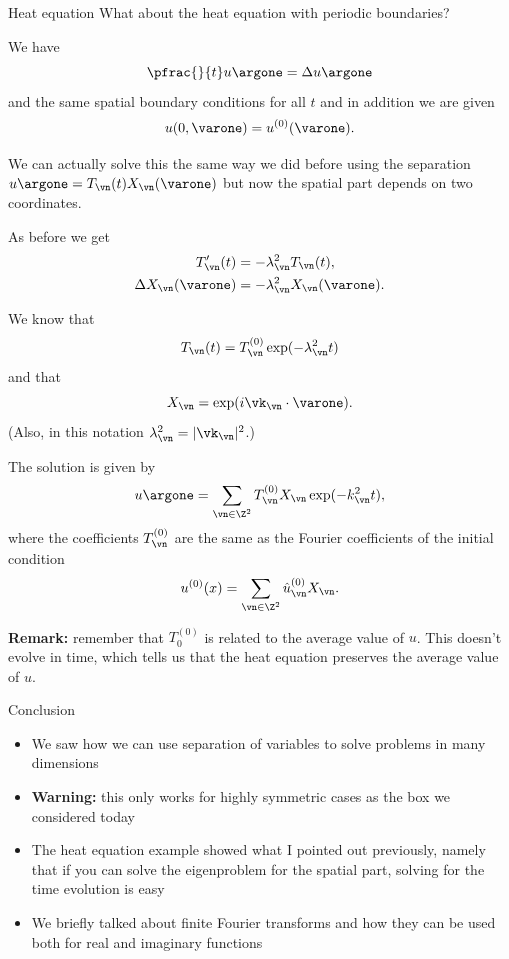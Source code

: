 \begin{frame}{Heat equation}
	What about the heat equation with periodic boundaries?
	
	\pause
	We have 
	\[  
	\pfrac{}{t} u\argone = \Delta u\argone
	\]
	and the same spatial boundary conditions for all $ t $ and in addition we are given
	\[  
	u(0,\varone) = u^{(0)}(\varone).
	\]
	
	\pause
	We can actually solve this the same way we did before using the separation $ u\argone = T_\vn(t) X_\vn (\varone)$ but now the spatial part depends on two coordinates. 
	
\end{frame}

\begin{frame}
	As before we get 
	\[  
	\begin{split}
	T_{\vn}'(t) &= -\lambda_{\vn}^2 T_{\vn}(t), \\
	\Delta X_{\vn}(\varone) &= -\lambda_{\vn}^2 X_{\vn}(\varone).
	\end{split}
	\]
	
	\pause
	We know that 
	\[  
	T_{\vn}(t) = T_{\vn}^{(0)} \exp(-\lambda_{\vn}^2 t)
	\]
	\pause
	and that 
	\[  
	X_\vn = \exp(i \vk_{\vn}\cdot \varone ).
	\]
	(Also, in this notation $ \lambda_{\vn}^2 = |\vk_{\vn}|^2$.)
	
\end{frame}

\begin{frame}
	The solution is given by 
	\[  
	u\argone = \sum_{\vn\in \Z^2} T_{\vn}^{(0)} X_\vn \exp(-k_{\vn}^2 t),
	\]
	where the coefficients $ T_{\vn}^{(0)} $ are the same as the Fourier coefficients of the initial condition 
	\[  
	u^{(0)}(x) = \sum_{\vn\in \Z^2} \hat{u}^{(0)}_{\vn} X_{\vn}.
	\]
	
	\textbf{Remark:} remember that $ T_{0}^{(0)} $ is related to the average value of $ u $. This doesn't evolve in time, which tells us that the heat equation preserves the average value of $ u $. 
\end{frame}

\begin{frame}{Conclusion}
	\begin{itemize}[<+->]
		\item We saw how we can use separation of variables to solve problems in many dimensions
		\item \textbf{Warning:} this only works for highly symmetric cases as the box we considered today
		\item The heat equation example showed what I pointed out previously, namely that if you can solve the eigenproblem for the spatial part, solving for the time evolution is easy
		\item We briefly talked about finite Fourier transforms and how they can be used both for real and imaginary functions
	\end{itemize}
\end{frame}


